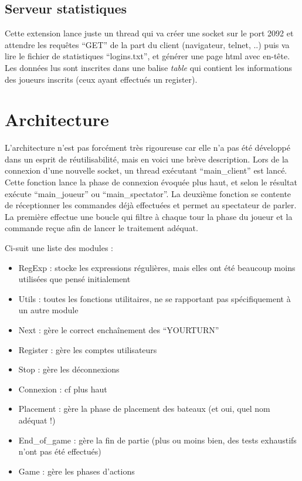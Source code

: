 \documentclass[a4paper, 11pt]{report}
\begin{document}
\subsection{Serveur statistiques}

Cette extension lance juste un thread qui va créer une socket sur le port 2092 et attendre les requêtes ``GET''
de la part du client (navigateur, telnet, ..) puis va lire le fichier de statistiques ``logins.txt'',
et générer une page html avec en-tête. Les données lus sont inscrites dans une balise \emph{table}
qui contient les informations des joueurs inscrits (ceux ayant effectués un register).

\section{Architecture}

L'architecture n'est pas forcément très rigoureuse car elle n'a pas été développé dans un esprit de réutilisabilité, mais en voici une brève description.
Lors de la connexion d'une nouvelle socket, un thread exécutant ``main\_client'' est lancé. Cette fonction lance la phase de connexion évoquée plus haut, et selon le résultat exécute ``main\_joueur'' ou ``main\_spectator''. La deuxième fonction se contente de réceptionner les commandes déjà effectuées et permet au spectateur de parler. La première effectue une boucle qui filtre à chaque tour la phase du joueur et la commande reçue afin de lancer le traitement adéquat.

Ci-suit une liste des modules :
\begin{itemize}
\item RegExp : stocke les expressions régulières, mais elles ont été beaucoup moins utilisées que pensé initialement
\item Utils : toutes les fonctions utilitaires, ne se rapportant pas spécifiquement à un autre module
\item Next : gère le correct enchaînement des ``YOURTURN''
\item Register : gère les comptes utilisateurs
\item Stop : gère les déconnexions
\item Connexion : cf plus haut
\item Placement : gère la phase de placement des bateaux (et oui, quel nom adéquat !)
\item End\_of\_game : gère la fin de partie (plus ou moins bien, des tests exhaustifs n'ont pas été effectués)
\item Game : gère les phases d'actions
\end{itemize}
\end{document}
